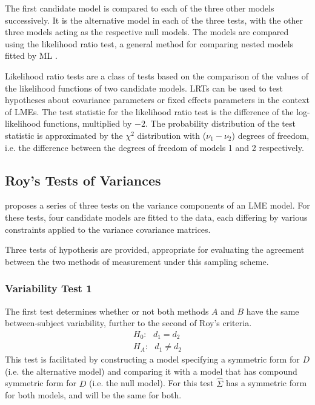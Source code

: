 \documentclass[12pt, a4paper]{report}
\theoremstyle{plain}
\theoremstyle{definition}
\theoremstyle{remark}
\begin{document}
	The first candidate model is compared to each of the three other models successively. It is the alternative model in each of the three tests, with the other three models acting as the respective null models. The models are compared using the likelihood ratio test, a general method for comparing nested models fitted by ML \citep{Lehmann2006}.
	
	Likelihood ratio tests are a class of tests based on the comparison of the values of the likelihood functions of two candidate models. LRTs can be used to test hypotheses about covariance parameters or fixed effects parameters in the context of LMEs. The test statistic for the likelihood ratio test is the difference of the log-likelihood functions, multiplied by $-2$.
	The probability distribution of the test statistic is approximated by the $\chi^2$ distribution with ($\nu_{1} - \nu_{2}$) degrees of freedom, i.e. the difference between the degrees of freedom of models 1 and 2 respectively. 
	
	

	\subsection{Roy's Tests of Variances}
	
	
	
	
	\citet{ARoy2009} proposes a series of three tests on the variance components of an LME model. For these tests, four candidate models are fitted to the data, each differing by various constraints applied to the variance covariance matrices. 
	
	
	
	
	Three tests of hypothesis are provided, appropriate for evaluating the agreement between the two methods of measurement under this sampling scheme. 
	
	\subsubsection{Variability Test 1}
	The first test determines whether or not both methods $A$ and $B$ have the same between-subject variability, further to the second of Roy's criteria.
	\begin{eqnarray*}
		H_{0}: \mbox{ }d_{1}  = d_{2} \\
		H_{A}: \mbox{ }d_{1}  \neq d_{2}
	\end{eqnarray*}
	This test is facilitated by constructing a model specifying a symmetric form for $D$ (i.e. the alternative model) and comparing it with a model that has compound symmetric form for $D$ (i.e. the null model). For this test ${\hat{\Sigma}}$ has a symmetric form for both models, and will be the same for both.
	
\end{document}
